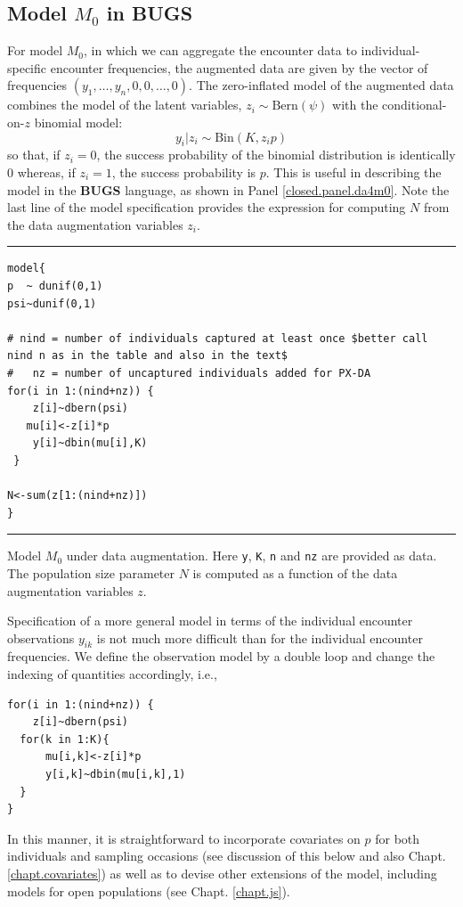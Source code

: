\subsection{Model $M_0$ in BUGS}

For model $M_0$, in which we can aggregate the encounter data to
individual-specific encounter frequencies, the augmented data are
given by the vector of frequencies $(y_{1}, \ldots, y_{n}, 0, 0,
\ldots, 0)$. The zero-inflated model of the augmented data combines
the model of the latent variables, $z_{i} \sim \mbox{Bern}(\psi)$ with
the conditional-on-$z$ binomial model:
\[
y_{i}|z_{i}   \sim \mbox{Bin}(K,z_{i} p) 
\]
so that, 
if $z_{i}=0$, the success probability of the binomial
distribution is identically 0 whereas, if $z_{i}=1$, the success
probability is $p$. This is useful in describing the model in the {\bf
  BUGS}
language, as shown in Panel \ref{closed.panel.da4m0}.
 Note the last line of the model
specification  provides the expression for computing $N$ from the
data augmentation variables $z_{i}$.

\begin{panel}[htp]
\centering
\rule[0.15in]{\textwidth}{.03in}
{\small
\begin{verbatim}
model{
p  ~ dunif(0,1)
psi~dunif(0,1)

# nind = number of individuals captured at least once $better call nind n as in the table and also in the text$
#   nz = number of uncaptured individuals added for PX-DA
for(i in 1:(nind+nz)) {
    z[i]~dbern(psi)
   mu[i]<-z[i]*p
    y[i]~dbin(mu[i],K)
 }

N<-sum(z[1:(nind+nz)])
}
\end{verbatim}
}
\rule[-0.15in]{\textwidth}{.03in}
\caption{Model $M_{0}$ under data augmentation. Here \mbox{\tt y},
  \mbox{\tt K}, \mbox{\tt n} and \mbox{\tt nz} are provided as
  data. The population size parameter $N$ is computed as a function of
the data augmentation variables $z$. }
\label{closed.panel.da4m0}
\end{panel}

Specification of a more general model in terms of the individual
encounter observations $y_{ik}$ is not much more difficult than for
the individual encounter frequencies.  We define the
observation model by a double loop and change the indexing of quantities
accordingly, i.e.,
{\small
\begin{verbatim}
for(i in 1:(nind+nz)) {
    z[i]~dbern(psi)
  for(k in 1:K){
      mu[i,k]<-z[i]*p
      y[i,k]~dbin(mu[i,k],1)
  }
}
\end{verbatim}
}
In this manner, it is straightforward to incorporate covariates on $p$ 
for both individuals and sampling occasions 
(see discussion of this below and also Chapt. \ref{chapt.covariates}) 
as well as to devise other extensions of the model, including models
for open populations (see Chapt. \ref{chapt.js}).

